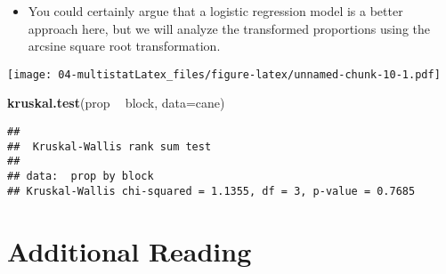 \documentclass[]{book}
\newenvironment{Shaded}{\begin{snugshade}}{\end{snugshade}}
\newcommand{\DataTypeTok}[1]{\textcolor[rgb]{0.13,0.29,0.53}{#1}}
\newcommand{\DecValTok}[1]{\textcolor[rgb]{0.00,0.00,0.81}{#1}}
\newcommand{\KeywordTok}[1]{\textcolor[rgb]{0.13,0.29,0.53}{\textbf{#1}}}
\newcommand{\NormalTok}[1]{#1}
\newcommand{\OperatorTok}[1]{\textcolor[rgb]{0.81,0.36,0.00}{\textbf{#1}}}
\newcommand{\StringTok}[1]{\textcolor[rgb]{0.31,0.60,0.02}{#1}}
\providecommand{\tightlist}{%
  \setlength{\itemsep}{0pt}\setlength{\parskip}{0pt}}
\begin{document}
\begin{Shaded}
\end{Shaded}

\begin{itemize}
\tightlist
\item
  You could certainly argue that a logistic regression model is a better approach here,
  but we will analyze the transformed proportions using the arcsine square root transformation.
\end{itemize}

\begin{Shaded}
\end{Shaded}

\texttt{[image: 04-multistatLatex\_files/figure-latex/unnamed-chunk-10-1.pdf]}

\begin{Shaded}
\begin{Highlighting}[]
\KeywordTok{kruskal.test}\NormalTok{(prop }\OperatorTok{~}\StringTok{ }\NormalTok{block, }\DataTypeTok{data=}\NormalTok{cane)}
\end{Highlighting}
\end{Shaded}

\begin{verbatim}
## 
##  Kruskal-Wallis rank sum test
## 
## data:  prop by block
## Kruskal-Wallis chi-squared = 1.1355, df = 3, p-value = 0.7685
\end{verbatim}

\hypertarget{additional-reading-1}{%
\section{Additional Reading}\label{additional-reading-1}}
\end{document}
